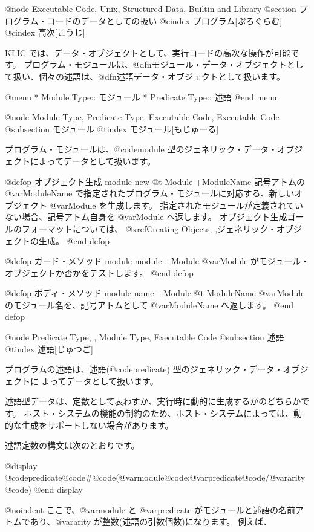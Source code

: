 {{{{@node Executable Code, Unix, Structured Data, Builtin and Library
@section プログラム・コードのデータとしての扱い
@cindex プログラム[ぷろぐらむ]
@cindex 高次[こうじ]

KLIC では、データ・オブジェクトとして、実行コードの高次な操作が可能です。
プログラム・モジュールは、@dfn{モジュール}・データ・オブジェクトとして扱い、個々の述語は、@dfn{述語}データ・オブジェクトとして扱います。

@menu
* Module Type::                 モジュール
* Predicate Type::              述語
@end menu

@node Module Type, Predicate Type, Executable Code, Executable Code
@subsection モジュール
@tindex モジュール[もじゅーる]

プログラム・モジュールは、@code{module} 型のジェネリック・データ・オブジェクトによってデータとして扱います。

@defop {オブジェクト生成} {module} new @t{-}Module +ModuleName
記号アトムの @var{ModuleName} で指定されたプログラム・モジュールに対応する、新しいオブジェクト @var{Module} を生成します。
指定されたモジュールが定義されていない場合、記号アトム自身を @var{Module} へ返します。
オブジェクト生成ゴールのフォーマットについては、
@xref{Creating Objects, ,ジェネリック・オブジェクトの生成}。
@end defop

@defop {ガード・メソッド} {module} module +Module
@var{Module} がモジュール・オブジェクトか否かをテストします。
@end defop

@defop {ボディ・メソッド} {module} name +Module @t{-}ModuleName
@var{Module} のモジュール名を、記号アトムとして @var{ModuleName} へ返します。
@end defop

@node Predicate Type,  , Module Type, Executable Code
@subsection 述語
@tindex 述語[じゅつご]

プログラムの述語は、述語(@code{predicate}) 型のジェネリック・データ・オブジェクトに
よってデータとして扱います。

述語型データは、定数として表わすか、実行時に動的に生成するかのどちらかです。
ホスト・システムの機能の制約のため、ホスト・システムによっては、動的な生成をサポートしない場合があります。

述語定数の構文は次のとおりです。

@display
@code{predicate}@code{#}@code{(}@var{module}@code{:}@var{predicate}@code{/}@var{arity}@code{)}
@end display

@noindent
ここで、@var{module} と @var{predicate} がモジュールと述語の名前アトムであり、@var{arity} が整数(述語の引数個数)になります。
例えば、

}}}}

